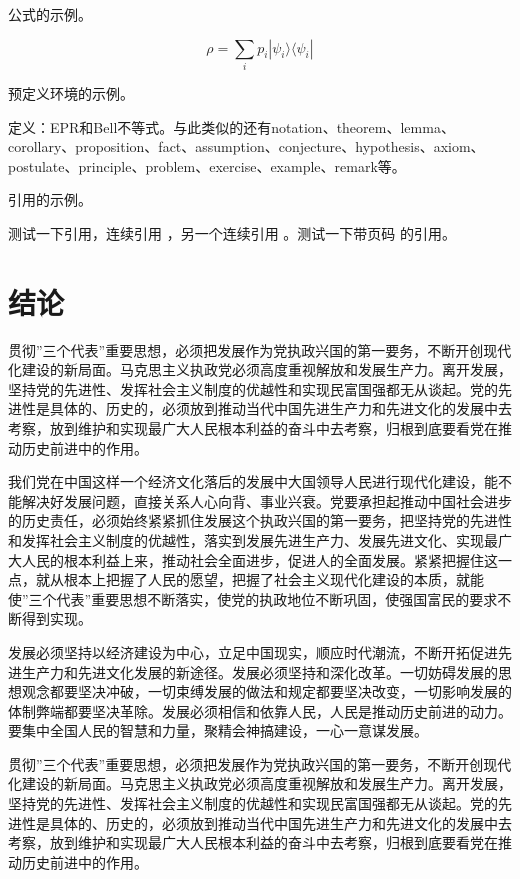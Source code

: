 \documentclass[adobefonts]{njuthesis}
\begin{document}
公式的示例。

\begin{equation}
\rho = \sum_i p_i  |\psi_i \rangle \langle \psi_i |
\end{equation}

预定义环境的示例。

\begin{definition}
定义：EPR和Bell不等式。与此类似的还有notation、theorem、lemma、corollary、proposition、fact、assumption、conjecture、hypothesis、axiom、postulate、principle、problem、exercise、example、remark等。
\end{definition}

引用的示例。

测试一下引用\cite{newman2006structure}，连续引用
\cite{newman2001random,aiello2000random,bollobas2001random}，另一个连续引用
\cite{newman2001random,bollobas2001random,barabasi1999emergence}。测试一下带页码
的引用\cite{erdHos1961strength}。

\chapter{结论}

贯彻”三个代表”重要思想，必须把发展作为党执政兴国的第一要务，不断开创现代化建设的新局面。马克思主义执政党必须高度重视解放和发展生产力。离开发展，坚持党的先进性、发挥社会主义制度的优越性和实现民富国强都无从谈起。党的先进性是具体的、历史的，必须放到推动当代中国先进生产力和先进文化的发展中去考察，放到维护和实现最广大人民根本利益的奋斗中去考察，归根到底要看党在推动历史前进中的作用。 

我们党在中国这样一个经济文化落后的发展中大国领导人民进行现代化建设，能不能解决好发展问题，直接关系人心向背、事业兴衰。党要承担起推动中国社会进步的历史责任，必须始终紧紧抓住发展这个执政兴国的第一要务，把坚持党的先进性和发挥社会主义制度的优越性，落实到发展先进生产力、发展先进文化、实现最广大人民的根本利益上来，推动社会全面进步，促进人的全面发展。紧紧把握住这一点，就从根本上把握了人民的愿望，把握了社会主义现代化建设的本质，就能使”三个代表”重要思想不断落实，使党的执政地位不断巩固，使强国富民的要求不断得到实现。 

发展必须坚持以经济建设为中心，立足中国现实，顺应时代潮流，不断开拓促进先进生产力和先进文化发展的新途径。发展必须坚持和深化改革。一切妨碍发展的思想观念都要坚决冲破，一切束缚发展的做法和规定都要坚决改变，一切影响发展的体制弊端都要坚决革除。发展必须相信和依靠人民，人民是推动历史前进的动力。要集中全国人民的智慧和力量，聚精会神搞建设，一心一意谋发展。 

贯彻”三个代表”重要思想，必须把发展作为党执政兴国的第一要务，不断开创现代化建设的新局面。马克思主义执政党必须高度重视解放和发展生产力。离开发展，坚持党的先进性、发挥社会主义制度的优越性和实现民富国强都无从谈起。党的先进性是具体的、历史的，必须放到推动当代中国先进生产力和先进文化的发展中去考察，放到维护和实现最广大人民根本利益的奋斗中去考察，归根到底要看党在推动历史前进中的作用。 
\end{document}

